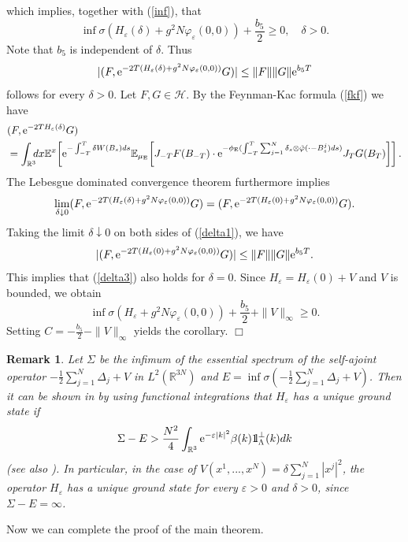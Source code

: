 \documentclass[11pt]{article}
\newtheorem{remark}[theorem]{Remark}
\newcommand{\br}[1]{\begin{remark}\label{#1}}
\newcommand{\er}{\end{remark}}
\def\bbbone{{\mathchoice {\rm 1\mskip-4mu l} {\rm 1\mskip-4mu l}
{\rm 1\mskip-4.5mu l} {\rm 1\mskip-5mu l}}}
\def\one{\bbbone}
\newcommand{\kp}{\one_\Lambda^\perp(k)}
\providecommand{\idx}{\int_{\BR} \!\!\! dx}
\newcommand{\Ebb}{{\mathbb E}}
\providecommand{\eq}[1]{\begin{equation}\label{#1}}
\providecommand{\en}{\end{equation}}
\providecommand{\qed}{\hfill {$\Box$}\par\medskip}
\providecommand{\BR}{{\mathbb{R}^3 }}
\providecommand{\RR}{\mathbb{R}}
\providecommand{\kak}[1]{(\ref{#1})}
\providecommand{\ms}[1]{\mathscr{#1}}
\providecommand{\is}{\inf \s}
\providecommand{\half}{\frac{1}{2}}
\providecommand{\s}{\sigma}
\providecommand{\hhh}{\ms H} %
\providecommand{\e}{{\rm e}}
\providecommand{\1}{\mathbb{1}}
\providecommand {\s}  {\ensuremath {\mathcal{S}}}
\providecommand{\eps}{\varepsilon}
\begin{document}
which implies, together with \kak{inf},  that
\eq{delta3}
\is \left(H_\eps(\delta)+g^2 N\varphi_\eps(0,0)\right)+\frac{b_5}{2} \geq0,\quad \delta>0.
\en
Note that $b_5$ is independent of $\delta$. Thus
\eq{delta1}
|(F, \e^{-2T(H_\eps(\delta)+g^2 N\varphi_\eps(0,0))}G)|\leq \|F\| \|G\| \e^{b_5 T}
\en
follows for every $\delta>0$. Let $F,G\in\hhh$. By the Feynman-Kac formula \kak{fkf} we have
\begin{align*}
&
(F, \e^{-2TH_\eps(\delta)}G)\\
&
=\idx \Ebb^x\!\left[\e^{-\int_{-T}^T \delta W(B_s) ds} \Ebb_{\mu_{\rm E}}\!
\left[J_{-T} F(B_{-T})\cdot  \e^{-\phi_{\rm E}(\int_{-T}^T\sum_{j=1}^N \delta_s\otimes
\tilde\varphi(\cdot-B_s^j) ds)} J_TG(B_T)\right]\right].
\end{align*}
The Lebesgue dominated convergence theorem furthermore implies
$$
\lim_{\delta\downarrow 0}(F, \e^{-2T(H_\eps(\delta)+g^2 N\varphi_\eps(0,0))}G)
= (F, \e^{-2T(H_\eps(0)+g^2 N\varphi_\eps(0,0))}G).
$$
Taking the limit $\delta\downarrow 0$ on both sides of \kak{delta1}, we have
\eq{delta2}
|(F, \e^{-2T(H_\eps(0)+g^2 N\varphi_\eps(0,0))}G)|\leq \|F\| \|G\| \e^{b_5T}.
\en
This implies that  \kak{delta3} also holds for $\delta=0$. Since $H_\eps=H_\eps(0)+V$ and $V$
is bounded, we obtain
$$
\is(H_\eps+g^2 N\varphi_\eps(0,0))+\frac{b_5}{2}+\|V\|_\infty \geq0.
$$
Setting $C=-\frac{b_5}{2}-\|V\|_\infty$ yields the corollary.
\qed
\br{existence}
\rm{
Let $\Sigma$ be the infimum of the essential spectrum of the self-ajoint operator $-\half \sum_{j=1}^N
\Delta_j +V$ in $L^2(\RR^{3N})$ and $E=\is(-\half\sum_{j=1}^N  \Delta_j +V)$. 
Then it can be shown in 
\cite{spo98} by using functional integrations  
 that $H_\eps$ has a unique ground state if
$$
\Sigma-E>\frac{N^2}{4} \int_\BR \e^{-\eps|k|^2}\beta(k) \kp dk
$$
(see also \cite[Theorem 6.6]{lhb11}). In particular, in the case of $V(x^1,...,x^N)=\delta \sum_{j=1}^N
|x^j|^2$, the operator $H_\eps$ has a unique ground state for every $\eps>0$ and $\delta>0$, since
$\Sigma-E=\infty$.
}
\er

Now we can complete the proof of the main theorem.
\end{document}

